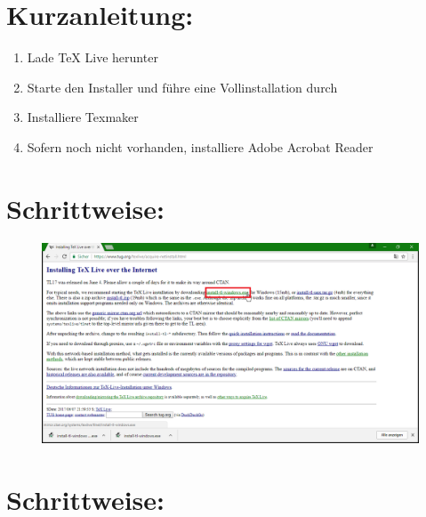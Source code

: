 \documentclass[12pt]{article}
\begin{document}
\section*{Kurzanleitung:}
\begin{enumerate}
\item Lade TeX Live herunter
\item Starte den Installer und führe eine Vollinstallation durch
\item Installiere Texmaker
\item Sofern noch nicht vorhanden, installiere Adobe Acrobat Reader
\end{enumerate}


\section*{Schrittweise:}
\begin{figure}[h]
\centering
{}
\includegraphics[width=\textwidth]{windows/p2.png}
\end{figure}
\FloatBarrier

\section*{Schrittweise:}
\end{document}
